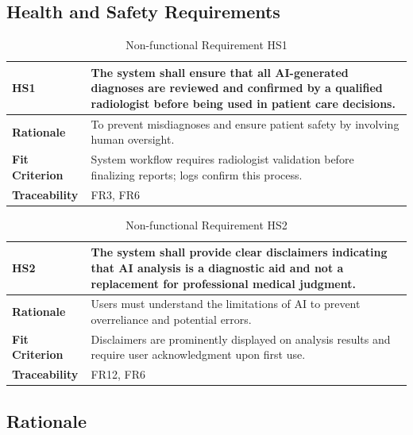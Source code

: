 \documentclass[12pt]{article}
\begin{document}
\subsection{Health and Safety Requirements}

\begin{table}[h!]
\centering
{}
\begin{tabular}{|p{3.5cm}|p{11.5cm}|}
\hline
\rowcolor{gray!30}
\textbf{HS1} & The system shall ensure that all AI-generated diagnoses are reviewed and confirmed by a qualified radiologist before being used in patient care decisions. \\
\hline
\textbf{Rationale} & To prevent misdiagnoses and ensure patient safety by involving human oversight. \\
\hline
\textbf{Fit Criterion} & System workflow requires radiologist validation before finalizing reports; logs confirm this process. \\
\hline
\textbf{Traceability} & FR3, FR6 \\
\hline
\end{tabular}
\caption{Non-functional Requirement HS1}
\end{table}

\begin{table}[h!]
\centering
{}
\begin{tabular}{|p{3.5cm}|p{11.5cm}|}
\hline
\rowcolor{gray!30}
\textbf{HS2} & The system shall provide clear disclaimers indicating that AI analysis is a diagnostic aid and not a replacement for professional medical judgment. \\
\hline
\textbf{Rationale} & Users must understand the limitations of AI to prevent overreliance and potential errors. \\
\hline
\textbf{Fit Criterion} & Disclaimers are prominently displayed on analysis results and require user acknowledgment upon first use. \\
\hline
\textbf{Traceability} & FR12, FR6 \\
\hline
\end{tabular}
\caption{Non-functional Requirement HS2}
\end{table}


\subsection{Rationale}

\newpage
\end{document}
